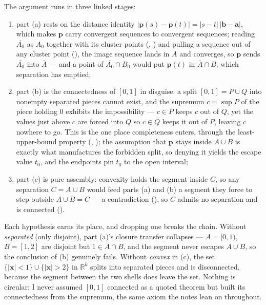 \documentclass[main.tex]{subfiles}
\begin{document}
\begin{Reflection}
The argument runs in three linked stages:
\begin{enumerate}[leftmargin=1.7em,itemsep=3pt,topsep=2pt,label=\textnormal{(\arabic*)}]
  \item part (a) rests on the distance identity $|\mathbf p(s)-\mathbf p(t)|=|s-t|\,|\mathbf b-\mathbf a|$,
        which makes $\mathbf p$ carry convergent sequences to convergent sequences; reading $\overline{A_{0}}$
        as $A_{0}$ together with its cluster points (, ) and pulling a sequence out of any cluster point (), the image sequence lands in $A$ and converges, so $\mathbf p$ sends
        $\overline{A_{0}}$ into $\overline A$ --- and a point of $\overline{A_{0}}\cap B_{0}$ would put
        $\mathbf p(t)$ in $\overline A\cap B$, which separation has emptied;
  \item part (b) is the connectedness of $[0,1]$ in disguise: a split $[0,1]=P\cup Q$ into nonempty separated
        pieces cannot exist, and the supremum $c=\sup P$ of the piece holding $0$ exhibits the impossibility ---
        $c\in\overline P$ keeps $c$ out of $Q$, yet the values just above $c$ are forced into $Q$ so
        $c\in\overline Q$ keeps it out of $P$, leaving $c$ nowhere to go. This is the one place
        completeness enters, through the least-upper-bound property (, ); the assumption that $\mathbf p$ stays inside $A\cup B$ is exactly what manufactures
        the forbidden split, so denying it yields the escape value $t_{0}$, and the endpoints pin $t_{0}$ to the
        open interval;
  \item part (c) is pure assembly: convexity holds the segment inside $C$, so any separation $C=A\cup B$ would
        feed parts (a) and (b) a segment they force to step outside $A\cup B=C$ --- a contradiction
        (), so $C$ admits no separation and is connected ().
\end{enumerate}

Each hypothesis earns its place, and dropping one breaks the chain. Without \emph{separated} (only
disjoint), part (a)'s closure transfer collapses --- $A=[0,1)$, $B=[1,2]$ are disjoint but $1\in\overline A\cap B$,
and the segment never escapes $A\cup B$, so the conclusion of (b) genuinely fails. Without
\emph{convex} in (c), the set $\{|\mathbf x|<1\}\cup\{|\mathbf x|>2\}$ in $\mathbb R^{k}$ splits into
separated pieces and is disconnected, because the segment between the two shells does leave the set.
Nothing is circular: I never assumed $[0,1]$ connected as a quoted theorem but built its connectedness from
the supremum, the same axiom the notes lean on throughout.


\end{Reflection}
\end{document}
